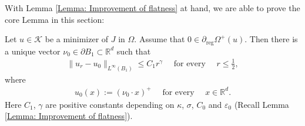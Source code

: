 \documentclass[11pt,reqno]{amsart}
\begin{document}
With Lemma \ref{Lemma: Improvement of flatness} at hand, we are able to prove the core Lemma in this section:
\begin{lemma}\label{Lemma: Uniqueness of the blow-ups}
	Let $u\in\mathcal{K}$ be a minimizer of $J$ in $\Omega$. Assume that $0\in\partial_{\mathrm{reg}}\varOmega^{+}(u)$. Then there is a unique vector $\nu_{0}\in\partial B_{1}\subset\mathbb{R}^{d}$ such that 
	\begin{align}\label{Formula: R(3)}
		\|u_{r}-u_{0}\|_{L^{\infty}(B_{1})}\leqslant C_{1}r^{\gamma}\quad\text{ for every }\quad r\leqslant\frac{1}{2},
	\end{align}
	where
	\begin{align}\label{Formula: R(4)}
		u_{0}(x):=(\nu_{0}\cdot x)^{+}\quad\text{ for every }\quad x\in\mathbb{R}^{d}.
	\end{align}
	Here $C_{1}$, $\gamma$ are positive constants depending on $\kappa$, $\sigma$, $C_{0}$ and $\varepsilon_{0}$ (Recall Lemma \ref{Lemma: Improvement of flatness}).
\end{lemma}
\end{document}
